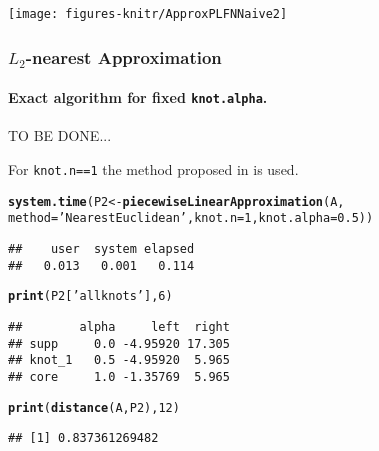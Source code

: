 \documentclass[11pt]{article}\usepackage{graphicx, color}
\makeatletter
\newcommand{\hlfunctioncall}[1]{\textcolor[rgb]{0.501960784313725,0,0.329411764705882}{\textbf{#1}}}%
\newcommand{\hlstring}[1]{\textcolor[rgb]{0.6,0.6,1}{#1}}%
\newenvironment{kframe}{%
 \def\at@end@of@kframe{}%
 \ifinner\ifhmode%
  \def\at@end@of@kframe{\end{minipage}}%
  \begin{minipage}{\columnwidth}%
 \fi\fi%
 \def\FrameCommand##1{\hskip\@totalleftmargin \hskip-\fboxsep
 \colorbox{shadecolor}{##1}\hskip-\fboxsep
     \hskip-\linewidth \hskip-\@totalleftmargin \hskip\columnwidth}%
 \MakeFramed {\advance\hsize-\width
   \@totalleftmargin\z@ \linewidth\hsize
   \@setminipage}}%
 {\par\unskip\endMakeFramed%
 \at@end@of@kframe}
\newenvironment{knitrout}{}{} %
\makeatother
\begin{document}
\begin{center}
\begin{knitrout}\small
{}\color{fgcolor}

{\centering \texttt{[image: figures-knitr/ApproxPLFNNaive2]} 

}



\end{knitrout}

\end{center}


\subsubsection{$L_2$-nearest Approximation}

\paragraph{Exact algorithm for fixed \texttt{knot.alpha}.}

TO BE DONE...

For \texttt{knot.n==1} the method proposed in \cite{CoroianuETAL2012}
is used.

\begin{knitrout}\small
{}\color{fgcolor}\begin{kframe}
\begin{alltt}
\hlfunctioncall{system.time}(P2 <- \hlfunctioncall{piecewiseLinearApproximation}(A,
   method=\hlstring{'NearestEuclidean'}, knot.n=1, knot.alpha=0.5))
\end{alltt}
\begin{verbatim}
##    user  system elapsed 
##   0.013   0.001   0.114
\end{verbatim}
\begin{alltt}
\hlfunctioncall{print}(P2[\hlstring{'allknots'}], 6)
\end{alltt}
\begin{verbatim}
##        alpha     left  right
## supp     0.0 -4.95920 17.305
## knot_1   0.5 -4.95920  5.965
## core     1.0 -1.35769  5.965
\end{verbatim}
\begin{alltt}
\hlfunctioncall{print}(\hlfunctioncall{distance}(A, P2), 12)
\end{alltt}
\begin{verbatim}
## [1] 0.837361269482
\end{verbatim}
\end{kframe}
\end{knitrout}
\end{document}
